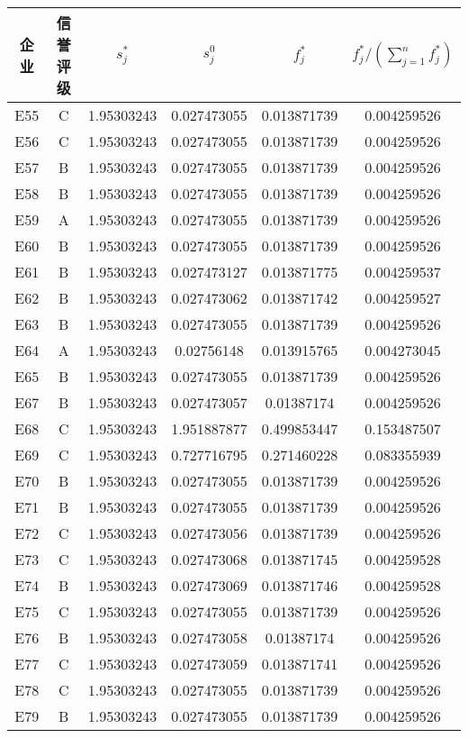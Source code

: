 \documentclass{cumcmthesis}
\begin{document}
\begin{appendices}
\begin{table}[H]   %
\centering
\begin{tabular}{cccccc}
\toprule[1.5pt]
企业& 信誉评级 & $s_j^*$ & $s_j^0$ & $f_j^*$ & $f_j^*/(\sum_{j=1}^n f_j^*)$ \\ 
\midrule[1pt]
E55 & C & 1.95303243 & 0.027473055 & 0.013871739 & 0.004259526 \\ 
E56 & C & 1.95303243 & 0.027473055 & 0.013871739 & 0.004259526 \\ 
E57 & B & 1.95303243 & 0.027473055 & 0.013871739 & 0.004259526 \\ 
E58 & B & 1.95303243 & 0.027473055 & 0.013871739 & 0.004259526 \\ 
E59 & A & 1.95303243 & 0.027473055 & 0.013871739 & 0.004259526 \\ 
E60 & B & 1.95303243 & 0.027473055 & 0.013871739 & 0.004259526 \\ 
E61 & B & 1.95303243 & 0.027473127 & 0.013871775 & 0.004259537 \\ 
E62 & B & 1.95303243 & 0.027473062 & 0.013871742 & 0.004259527 \\ 
E63 & B & 1.95303243 & 0.027473055 & 0.013871739 & 0.004259526 \\ 
E64 & A & 1.95303243 & 0.02756148 & 0.013915765 & 0.004273045 \\ 
E65 & B & 1.95303243 & 0.027473055 & 0.013871739 & 0.004259526 \\ 
E67 & B & 1.95303243 & 0.027473057 & 0.01387174 & 0.004259526 \\ 
E68 & C & 1.95303243 & 1.951887877 & 0.499853447 & 0.153487507 \\ 
E69 & C & 1.95303243 & 0.727716795 & 0.271460228 & 0.083355939 \\ 
E70 & B & 1.95303243 & 0.027473055 & 0.013871739 & 0.004259526 \\ 
E71 & B & 1.95303243 & 0.027473055 & 0.013871739 & 0.004259526 \\ 
E72 & C & 1.95303243 & 0.027473056 & 0.013871739 & 0.004259526 \\ 
E73 & C & 1.95303243 & 0.027473068 & 0.013871745 & 0.004259528 \\ 
E74 & B & 1.95303243 & 0.027473069 & 0.013871746 & 0.004259528 \\ 
E75 & C & 1.95303243 & 0.027473055 & 0.013871739 & 0.004259526 \\ 
E76 & B & 1.95303243 & 0.027473058 & 0.01387174 & 0.004259526 \\ 
E77 & C & 1.95303243 & 0.027473059 & 0.013871741 & 0.004259526 \\ 
E78 & C & 1.95303243 & 0.027473055 & 0.013871739 & 0.004259526 \\ 
E79 & B & 1.95303243 & 0.027473055 & 0.013871739 & 0.004259526 \\ 
		\bottomrule[1.5pt]
\end{tabular}
\end{table}


\end{appendices}
\end{document}
